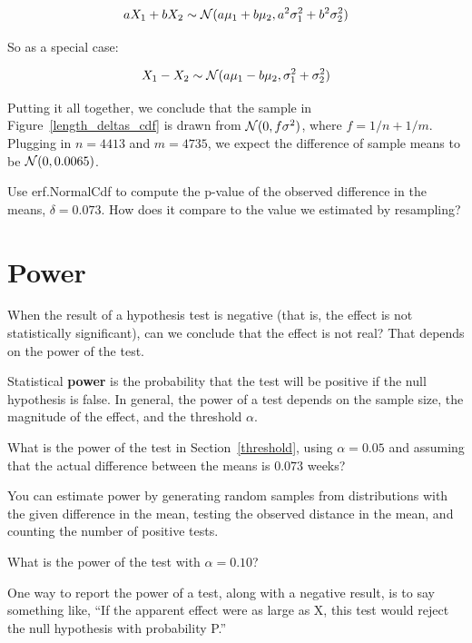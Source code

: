 \documentclass[12pt]{book}
\begin{document}
\[ aX_1 + bX_2 \sim \mathcal{N} (a\mu_1 + b\mu_2, 
                                 a^2\sigma_1^2 + b^2\sigma_2^2) \]

So as a special case:

\[ X_1 - X_2 \sim \mathcal{N} (a\mu_1 - b\mu_2, 
                               \sigma_1^2 + \sigma_2^2) \]

Putting it all together, we conclude that the sample in
Figure~\ref{length_deltas_cdf} is drawn from 
$\mathcal{N} (0, f \sigma^2)$, where $f = 1/n + 1/m$.  Plugging in
$n=4413$ and $m=4735$, we expect the difference of sample means to be
$\mathcal{N} (0, 0.0065)$.

\begin{ex}

Use erf.NormalCdf to compute the p-value of the observed difference
in the means, $\delta=0.073$.  How does it compare to the value
we estimated by resampling?

\end{ex}



\section{Power}

When the result of a hypothesis test is negative (that is, the effect is
not statistically significant), can we conclude that the effect is not
real?  That depends on the power of the test.

Statistical {\bf power} is the probability that the test will be
positive if the null hypothesis is false.  In general, the power of a
test depends on the sample size, the magnitude of the effect, and the
threshold $\alpha$.

\begin{ex}

What is the power of the test in Section~\ref{threshold}, using
$\alpha=0.05$ and assuming that the actual difference between the
means is $0.073$ weeks?

You can estimate power by generating random samples from distributions
with the given difference in the mean, testing the observed distance
in the mean, and counting the number of positive tests.

What is the power of the test with $\alpha=0.10$?

\end{ex}

One way to report the power of a test, along with a negative result,
is to say something like, ``If the apparent effect were as large
as X, this test would reject the null hypothesis with probability P.''
\end{document}
